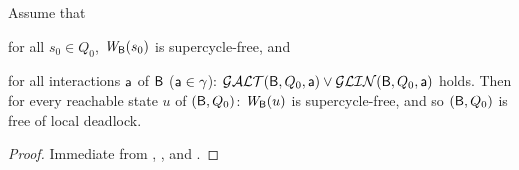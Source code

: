 \begin{corollary}  
\label{theorem:global.deadlock-free}
Assume that
\bn
\item \label{theorem:global.deadlock-free.initial}
      for all $s_0 \in Q_0$, $\mathit{W}_{\mathsf{B}}({s_0})$ is supercycle-free, and
\item \label{theorem:global.deadlock-free.scfPres}
      for all interactions $\mathsf{a}$ of $\mathsf{B}$ (\ie $\mathsf{a} \in \gamma$):  $\mathcal{GALT}(\mathsf{B}, Q_0, \mathsf{a}) \lor \mathcal{GLIN}(\mathsf{B}, Q_0, \mathsf{a})$ holds.
\en
Then for every reachable state $u$ of $(\mathsf{B}, Q_0)$:  $\mathit{W}_{\mathsf{B}}({u})$ is supercycle-free, and so 
$(\mathsf{B}, Q_0)$ is free of local deadlock.
\end{corollary}
%
\begin{proof}
Immediate from ,  , and .
\end{proof}




